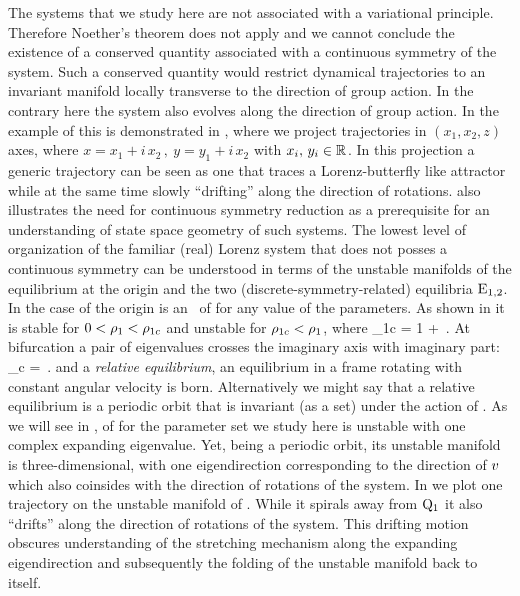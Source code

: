 The systems that we study here are not associated with a variational principle. Therefore
Noether's theorem does not apply and we  cannot conclude the existence of a conserved quantity associated
with a continuous symmetry of the system. Such a conserved quantity would restrict dynamical
trajectories to an invariant manifold locally transverse to the direction of group action.
In the contrary here the system also evolves along the direction of group action. In the example of {\CLe}
this is demonstrated in , where we project trajectories in $(x_1,x_2,z)$ axes, 
where $x=x_1+ i\, x_2\,,\ y=y_1+i\, x_2$ with $x_i,\,y_i\in\mathbb{R}^{}$. In this projection a generic 
trajectory can be seen as one that traces a Lorenz-butterfly like attractor while at the same time slowly
``drifting'' along the direction of rotations.  also illustrates the need for continuous symmetry 
reduction as a prerequisite for an understanding of state space geometry of such systems. 
The lowest level of organization of the familiar (real) Lorenz system that does not posses a continuous symmetry
can be understood in terms of the unstable manifolds of the equilibrium at the origin and the two (discrete-symmetry-related) equilibria $\mathrm{E}_{1,2}$. In the case of {\CLe}  the origin  
is an \eqv\ of  for any
value of the parameters. As shown in  it
is stable for $0<\rho_1<\rho_{1c}$ and unstable for
$\rho_{1c}<\rho_1$, where
\beq
	\rho_{1c} = 1 + \,.
\eeq
At bifurcation a pair of eigenvalues crosses the imaginary axis with imaginary part:
\beq
	\omega_c = \,.
	\label{eq:omegaCLE}
\eeq
and a \emph{relative equilibrium}, an equilibrium in a frame rotating with constant angular velocity
is born. Alternatively we might say that a relative equilibrium is a periodic orbit that is invariant (as a set)
under the action of \Gelement{}.
  As we will see in ,  of {\CLe} for 
the parameter set we study here is unstable with one complex expanding eigenvalue. Yet, being a periodic
orbit, its unstable manifold is three-dimensional, with one eigendirection corresponding
to the direction of $v$ which also coinsides with the direction of rotations of the system. 
In  we plot one trajectory on the unstable manifold of . While it spirals away
from $\mathrm{Q}_{1}$ it also ``drifts'' along the direction of rotations of the system. This drifting motion obscures 
understanding of the stretching mechanism along the expanding eigendirection and subsequently the folding of the
unstable manifold back to itself.

